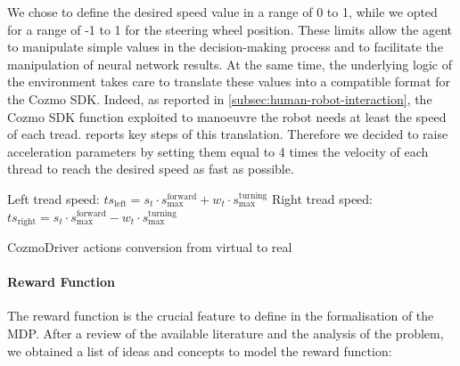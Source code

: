 We chose to define the desired speed value in a range of 0 to 1, while we opted for a range of -1 to 1 for the steering wheel position.
These limits allow the agent to manipulate simple values in the decision-making process and to facilitate the manipulation of neural network results.
At the same time, the underlying logic of the environment takes care to translate these values into a compatible format for the Cozmo SDK.
Indeed, as reported in \vref{subsec:human-robot-interaction}, the Cozmo SDK function exploited to manoeuvre the robot needs at least the speed of each tread.
 reports key steps of this translation.
Therefore we decided to raise acceleration parameters by setting them equal to 4 times the velocity of each thread to reach the desired speed as fast as possible.

\begin{algorithm}[!h]
    \SetAlgoLined
    \small
    \DontPrintSemicolon
    \LinesNumbered

    Left tread speed: $ts_{\text{left}} = s_t \cdot s^{\text{forward}}_{\text{max}} + w_t \cdot s^{\text{turning}}_{\text{max}}$\;
    Right tread speed: $ts_{\text{right}} = s_t \cdot s^{\text{forward}}_{\text{max}} - w_t \cdot s^{\text{turning}}_{\text{max}}$

    \caption{CozmoDriver actions conversion from virtual to real}
    \label{conversionCozmoDriver}
\end{algorithm}


\paragraph{Reward Function}

The reward function is the crucial feature to define in the formalisation of the MDP.
After a review of the available literature and the analysis of the problem, we obtained a list of ideas and concepts to model the reward function:

